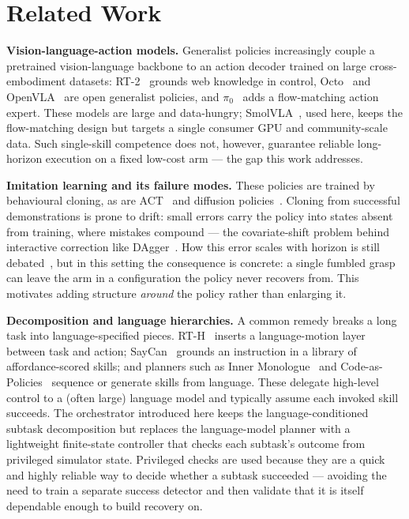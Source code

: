 \section{Related Work}
\label{sec:related}

\textbf{Vision-language-action models.} Generalist policies increasingly couple a pretrained vision-language backbone to an action decoder trained on large cross-embodiment datasets: \mbox{RT-2}~\cite{brohan2023rt2} grounds web knowledge in control, Octo~\cite{octo2024} and OpenVLA~\cite{kim2024openvla} are open generalist policies, and $\pi_0$~\cite{black2024pi0} adds a flow-matching action expert. These models are large and data-hungry; SmolVLA~\cite{shukor2025smolvla}, used here, keeps the flow-matching design but targets a single consumer GPU and community-scale data. Such single-skill competence does not, however, guarantee reliable long-horizon execution on a fixed low-cost arm --- the gap this work addresses.

\textbf{Imitation learning and its failure modes.} These policies are trained by behavioural cloning, as are ACT~\cite{zhao2023act} and diffusion policies~\cite{chi2023diffusion}. Cloning from successful demonstrations is prone to drift: small errors carry the policy into states absent from training, where mistakes compound --- the covariate-shift problem behind interactive correction like DAgger~\cite{ross2011dagger}. How this error scales with horizon is still debated~\cite{spencer2021feedback,foster2024horizon}, but in this setting the consequence is concrete: a single fumbled grasp can leave the arm in a configuration the policy never recovers from. This motivates adding structure \emph{around} the policy rather than enlarging it.

\textbf{Decomposition and language hierarchies.} A common remedy breaks a long task into language-specified pieces. RT-H~\cite{belkhale2024rth} inserts a language-motion layer between task and action; SayCan~\cite{ahn2022saycan} grounds an instruction in a library of affordance-scored skills; and planners such as Inner Monologue~\cite{huang2022inner} and Code-as-Policies~\cite{liang2022cap} sequence or generate skills from language. These delegate high-level control to a (often large) language model and typically assume each invoked skill succeeds. The orchestrator introduced here keeps the language-conditioned subtask decomposition but replaces the language-model planner with a lightweight finite-state controller that checks each subtask's outcome from privileged simulator state. Privileged checks are used because they are a quick and highly reliable way to decide whether a subtask succeeded --- avoiding the need to train a separate success detector and then validate that it is itself dependable enough to build recovery on.

